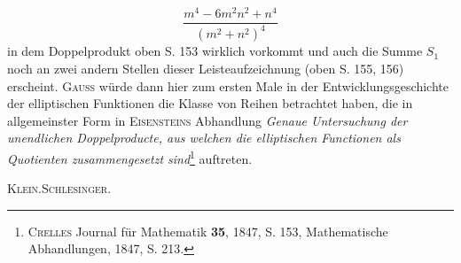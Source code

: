 \[
\frac{m^4-6m^2n^2+n^4}{(m^2+n^2)^4}
\]
\noindent in dem Doppelprodukt oben S. 153 wirklich vorkommt und auch die Summe \(S_1\) noch an zwei andern Stellen dieser Leisteaufzeichnung (oben S. 155, 156) erscheint. \textsc{Gauss} würde dann hier zum ersten Male in der Entwicklungsgeschichte der elliptischen Funktionen die Klasse von Reihen betrachtet haben, die in allgemeinster Form in \textsc{Eisensteins} Abhandlung \textit{Genaue Untersuchung der unendlichen Doppelproducte, aus welchen die elliptischen Functionen als Quotienten zusammengesetzt sind}\footnote{\textsc{Crelles} Journal für Mathematik \textbf{35}, 1847, S. 153, Mathematische Abhandlungen, 1847, S. 213.} auftreten.
\par\noindent\hfill\textsc{Klein.\quad Schlesinger.}
\par\endgroup
